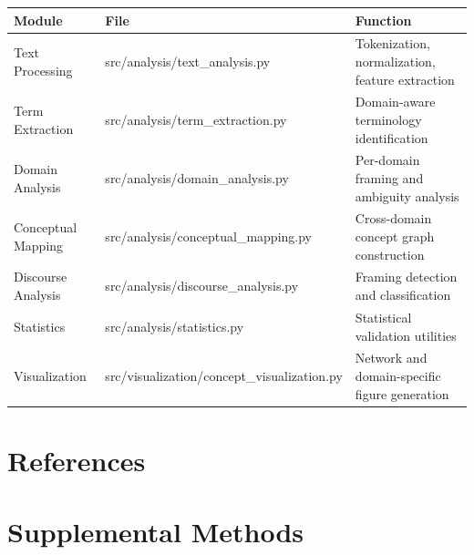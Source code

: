\documentclass[
]{article}
\newcounter{none} %
\numberwithin{equation}{section}
\renewcommand{\texttt}[1]{%
    \colorbox{codebg}{\color{codefg}\ttfamily #1}%
}
\begin{document}
{\def\LTcaptype{none} %
\begin{longtable}[]{@{}
  >{\raggedright\arraybackslash}p{}
  >{\raggedright\arraybackslash}p{}
  >{\raggedright\arraybackslash}p{}@{}}
\toprule\noalign{}
\begin{minipage}[b]{\linewidth}\raggedright
Module
\end{minipage} & \begin{minipage}[b]{\linewidth}\raggedright
File
\end{minipage} & \begin{minipage}[b]{\linewidth}\raggedright
Function
\end{minipage} \\
\midrule\noalign{}
\endhead
\bottomrule\noalign{}
\endlastfoot
Text Processing & \texttt{src/analysis/text\_analysis.py} &
Tokenization, normalization, feature extraction \\
Term Extraction & \texttt{src/analysis/term\_extraction.py} &
Domain-aware terminology identification \\
Domain Analysis & \texttt{src/analysis/domain\_analysis.py} & Per-domain
framing and ambiguity analysis \\
Conceptual Mapping & \texttt{src/analysis/conceptual\_mapping.py} &
Cross-domain concept graph construction \\
Discourse Analysis & \texttt{src/analysis/discourse\_analysis.py} &
Framing detection and classification \\
Statistics & \texttt{src/analysis/statistics.py} & Statistical
validation utilities \\
Visualization & \texttt{src/visualization/concept\_visualization.py} &
Network and domain-specific figure generation \\
\end{longtable}
}

\newpage

\section{References}\label{sec:references}

\nocite{*}




\newpage

\section{Supplemental Methods}\label{sec:supplemental_methods}
\end{document}
